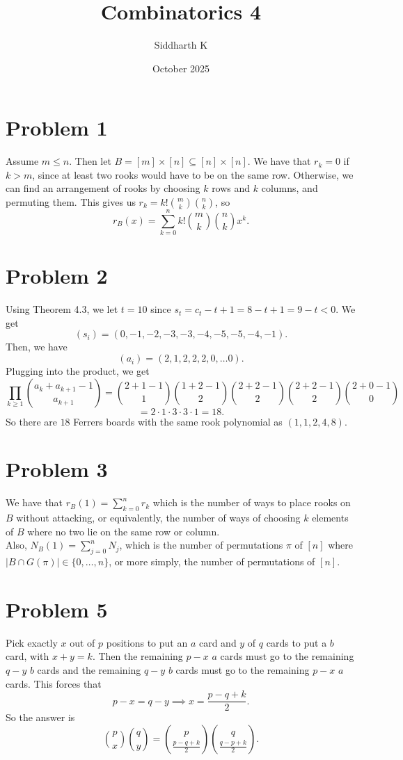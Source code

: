 \documentclass{article}
\title{Combinatorics 4}
\author{Siddharth K}
\date{October 2025}
\begin{document}
\maketitle

\section*{Problem 1}
Assume $m \le n$. Then let $B = [m] \times [n] \subseteq [n] \times [n]$. We have that $r_k = 0$ if $k > m$, since at least two rooks would have to be on the same row. Otherwise, we can find an arrangement of rooks by choosing $k$ rows and $k$ columns, and permuting them. This gives us $r_k = k!\binom mk \binom nk$, so
$$r_B(x) = \sum_{k = 0}^n k! \binom mk \binom nk x^k.$$

\section*{Problem 2}
Using Theorem 4.3, we let $t = 10$ since $s_t = c_t - t + 1 = 8 - t + 1 = 9 - t < 0$. We get
$$(s_i) = (0, -1, -2, -3, -3, -4, -5, -5, -4, -1).$$
Then, we have
$$(a_i) = (2, 1, 2, 2, 2, 0, \ldots 0).$$
Plugging into the product, we get
$$\prod_{k \ge 1}\binom{a_k + a_{k + 1} - 1}{a_{k + 1}} = \binom{2 + 1 - 1}{1}\binom{1 + 2 - 1}{2}\binom{2 + 2 - 1}{2}\binom{2 + 2 - 1}{2}\binom{2 + 0 - 1}{0}$$
$$= 2 \cdot 1 \cdot 3 \cdot 3 \cdot 1 = 18.$$
So there are $18$ Ferrers boards with the same rook polynomial as $(1, 1, 2, 4, 8)$.

\section*{Problem 3}
We have that $r_B(1) = \sum_{k = 0}^n r_k$ which is the number of ways to place rooks on $B$ without attacking, or equivalently, the number of ways of choosing $k$ elements of $B$ where no two lie on the same row or column. \\

Also, $N_B(1) = \sum_{j = 0}^n N_j$, which is the number of permutations $\pi$ of $[n]$ where $|B \cap G(\pi)| \in \{0, \ldots, n\}$, or more simply, the number of permutations of $[n]$.

\section*{Problem 5}
Pick exactly $x$ out of $p$ positions to put an $a$ card and $y$ of $q$ cards to put a $b$ card, with $x + y = k$. Then the remaining $p - x$ $a$ cards must go to the remaining $q - y$ $b$ cards and the remaining $q - y$ $b$ cards must go to the remaining $p - x$ $a$ cards. This forces that
$$p - x = q - y \implies x = \frac{p - q + k}{2}.$$
So the answer is
$$\binom px \binom qy = \binom{p}{\frac{p - q + k}{2}} \binom{q}{\frac{q - p + k}{2}}.$$
\end{document}
